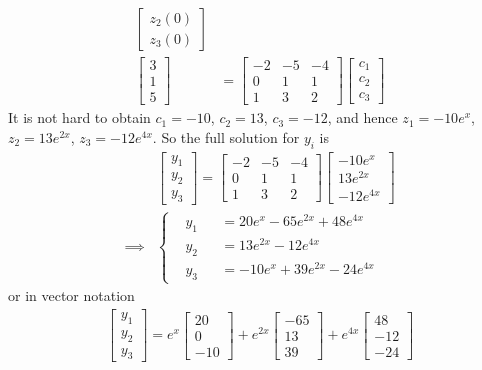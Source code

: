 \begin{solution}
\begin{align*}
\begin{bmatrix}
z_2(0) \\
z_3(0)
\end{bmatrix} \\
\begin{bmatrix}
3 \\
1 \\
5
\end{bmatrix}
&=
\begin{bmatrix}
-2 & -5 & -4 \\
0 & 1 & 1 \\
1 & 3 & 2
\end{bmatrix}
\begin{bmatrix}
c_1 \\
c_2 \\
c_3
\end{bmatrix}
\end{align*}
It is not hard to obtain $c_1 = -10$, $c_2 = 13$, $c_3 = -12$, and hence $z_1 = -10e^x$, $z_2 = 13e^{2x}$, $z_3 = -12e^{4x}$. So the full solution for $y_i$ is
\begin{align*}
&
\begin{bmatrix}
y_1 \\
y_2 \\
y_3
\end{bmatrix}
=
\begin{bmatrix}
-2 & -5 & -4 \\
0 & 1 & 1 \\
1 & 3 & 2
\end{bmatrix}
\begin{bmatrix}
-10e^x \\
13e^{2x} \\
-12e^{4x}
\end{bmatrix} \\
\implies & \left\{\begin{alignedat}{2}
&y_1& &= 20e^{x} - 65e^{2x} + 48e^{4x} \\
&y_2& &= 13e^{2x} - 12e^{4x} \\
&y_3& &= -10e^{x} + 39e^{2x} - 24e^{4x}
\end{alignedat}\right.
\end{align*}
or in vector notation
\begin{align*}
\begin{bmatrix}
y_1 \\
y_2 \\
y_3
\end{bmatrix}
=
e^{x}
\begin{bmatrix}
20 \\
0 \\
-10
\end{bmatrix}
+
e^{2x}
\begin{bmatrix}
-65 \\
13 \\
39
\end{bmatrix}
+
e^{4x}
\begin{bmatrix}
48 \\
-12 \\
-24
\end{bmatrix}
\end{align*}
\end{solution}
